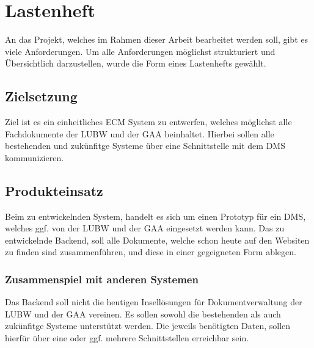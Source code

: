 \section{Lastenheft} \label{Lastenheft}
An das Projekt, welches im Rahmen dieser Arbeit bearbeitet werden soll, gibt es viele Anforderungen. Um alle Anforderungen m\"oglichst strukturiert und \"Ubersichtlich darzustellen, wurde die Form eines Lastenhefts gew\"ahlt.

\subsection{Zielsetzung} \label{Zielsetzung}
Ziel ist es ein einheitliches \ac{ECM} System zu entwerfen, welches m\"oglichst alle Fachdokumente der \ac{LUBW} und der \ac{GAA} beinhaltet.
Hierbei sollen alle bestehenden und zuk\"unfitge Systeme \"uber eine Schnittstelle mit dem \ac{DMS} kommunizieren.

\subsection{Produkteinsatz} \label{Produkteinsatz}
Beim zu entwickelnden System, handelt es sich um einen Prototyp f\"ur ein \ac{DMS}, welches ggf. von der \ac{LUBW} und der \ac{GAA} eingesetzt werden kann. Das zu entwickelnde Backend, soll alle Dokumente, welche schon heute auf den Websiten zu finden sind zusammenf\"uhren, und diese in einer gegeigneten Form ablegen.

\subsubsection{Zusammenspiel mit anderen Systemen} \label{Zusammenspiel mit anderen Systemen}
Das Backend soll nicht die heutigen Insell\"osungen f\"ur Dokumentverwaltung der \ac{LUBW} und der \ac{GAA} vereinen. Es sollen sowohl die bestehenden als auch zuk\"unfitge Systeme unterst\"utzt werden. Die jeweils ben\"otigten Daten, sollen hierf\"ur \"uber eine oder ggf. mehrere Schnittstellen erreichbar sein.


